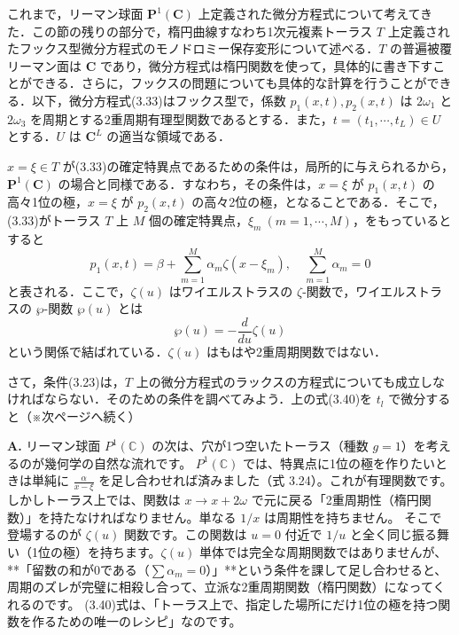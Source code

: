 \begin{story}
これまで，リーマン球面 $\mathbf{P}^1(\mathbf{C})$ 上定義された微分方程式について考えてきた．この節の残りの部分で，楕円曲線すなわち1次元複素トーラス $T$ 上定義されたフックス型微分方程式のモノドロミー保存変形について述べる．$T$ の普遍被覆リーマン面は $\mathbf{C}$ であり，微分方程式は楕円関数を使って，具体的に書き下すことができる．さらに，フックスの問題についても具体的な計算を行うことができる．以下，微分方程式(3.33)はフックス型で，係数 $p_1(x,t), p_2(x,t)$ は $2\omega_1$ と $2\omega_3$ を周期とする2重周期有理型関数であるとする．また，$t=(t_1, \cdots, t_L) \in U$ とする．$U$ は $\mathbf{C}^L$ の適当な領域である．

$x=\xi \in T$ が(3.33)の確定特異点であるための条件は，局所的に与えられるから，$\mathbf{P}^1(\mathbf{C})$ の場合と同様である．すなわち，その条件は，$x=\xi$ が $p_1(x,t)$ の高々1位の極，$x=\xi$ が $p_2(x,t)$ の高々2位の極，となることである．そこで，(3.33)がトーラス $T$ 上 $M$ 個の確定特異点，$\xi_m \ (m=1,\cdots,M)$，をもっているとすると
\begin{equation}
    p_1(x,t) = \beta + \sum_{m=1}^M \alpha_m \zeta(x-\xi_m), \quad \sum_{m=1}^M \alpha_m = 0 \label{eq:3.40}
\end{equation}
と表される．ここで，$\zeta(u)$ はワイエルストラスの $\zeta$-関数で，ワイエルストラスの $\wp$-関数 $\wp(u)$ とは
\begin{equation*}
    \wp(u) = -\frac{d}{du}\zeta(u)
\end{equation*}
という関係で結ばれている．$\zeta(u)$ はもはや2重周期関数ではない．

さて，条件(3.23)は，$T$ 上の微分方程式のラックスの方程式についても成立しなければならない．そのための条件を調べてみよう．上の式(3.40)を $t_l$ で微分すると（※次ページへ続く）

\end{story}

\begin{Q}
\textbf{A.} リーマン球面 $P^1(\mathbb{C})$ の次は、穴が1つ空いたトーラス（種数 $g=1$）を考えるのが幾何学の自然な流れです。
$P^1(\mathbb{C})$ では、特異点に1位の極を作りたいときは単純に $\frac{\alpha}{x-\xi}$ を足し合わせれば済みました（式 3.24）。これが有理関数です。
しかしトーラス上では、関数は $x \to x + 2\omega$ で元に戻る「2重周期性（楕円関数）」を持たなければなりません。単なる $1/x$ は周期性を持ちません。
そこで登場するのが $\zeta(u)$ 関数です。この関数は $u=0$ 付近で $1/u$ と全く同じ振る舞い（1位の極）を持ちます。$\zeta(u)$ 単体では完全な周期関数ではありませんが、**「留数の和が0である（$\sum \alpha_m = 0$）」**という条件を課して足し合わせると、周期のズレが完璧に相殺し合って、立派な2重周期関数（楕円関数）になってくれるのです。
(3.40)式は、「トーラス上で、指定した場所にだけ1位の極を持つ関数を作るための唯一のレシピ」なのです。
\end{Q}

